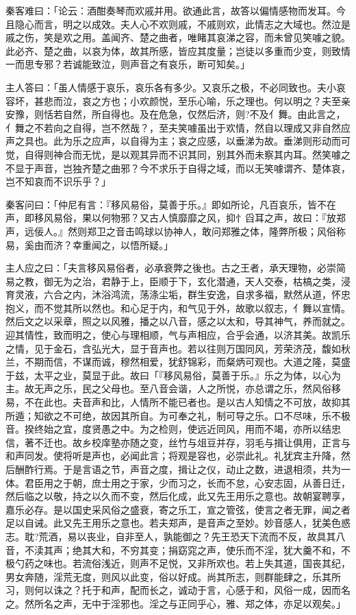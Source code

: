 \documentclass[UTF8,titlepage,oneside]{ctexbook}
\begin{document}
秦客难曰：「论云：酒酣奏琴而欢戚并用。欲通此言，故答以偏情感物而发耳。今且隐心而言，明之以成效。夫人心不欢则戚，不戚则欢，此情志之大域也。然泣是戚之伤，笑是欢之用。盖闻齐、楚之曲者，唯睹其哀涕之容，而未曾见笑噱之貌。此必齐、楚之曲，以哀为体，故其所感，皆应其度量；岂徒以多重而少变，则致情一而思专邪？若诚能致泣，则声音之有哀乐，断可知矣。」


主人答曰：「虽人情感于哀乐，哀乐各有多少。又哀乐之极，不必同致也。夫小哀容坏，甚悲而泣，哀之方也；小欢颜悦，至乐心喻，乐之理也。何以明之？夫至亲安豫，则恬若自然，所自得也。及在危急，仅然后济，则?不及亻舞。由此言之，亻舞之不若向之自得，岂不然哉？，至夫笑噱虽出于欢情，然自以理成又非自然应声之具也。此为乐之应声，以自得为主；哀之应感，以垂涕为故。垂涕则形动而可觉，自得则神合而无忧，是以观其异而不识其同，别其外而未察其内耳。然笑噱之不显于声音，岂独齐楚之曲邪？今不求乐于自得之域，而以无笑噱谓齐、楚体哀，岂不知哀而不识乐乎？」


秦客问曰：「仲尼有言：『移风易俗，莫善于乐。』即如所论，凡百哀乐，皆不在声，即移风易俗，果以何物邪？又古人慎靡靡之风，抑忄舀耳之声，故曰：『放郑声，远佞人。』然则郑卫之音击鸣球以协神人，敢问郑雅之体，隆弊所极；风俗称易，奚由而济？幸重闻之，以悟所疑。」


主人应之曰：「夫言移风易俗者，必承衰弊之後也。古之王者，承天理物，必崇简易之教，御无为之治，君静于上，臣顺于下，玄化潜通，天人交泰，枯槁之类，浸育灵液，六合之内，沐浴鸿流，荡涤尘垢，群生安逸，自求多福，默然从道，怀忠抱义，而不觉其所以然也。和心足于内，和气见于外，故歌以叙志，亻舞以宣情。然后文之以采章，照之以风雅，播之以八音，感之以太和，导其神气，养而就之。迎其情性，致而明之，使心与理相顺，气与声相应，合乎会通，以济其美。故凯乐之情，见于金石，含弘光大，显于音声也。若以往则万国同风，芳荣济茂，馥如秋兰，不期而信，不谋而诚，穆然相爱，犹舒锦彩，而粲炳可观也。大道之隆，莫盛于兹，太平之业，莫显于此。故曰「『移风易俗，莫善于乐。』乐之为体，以心为主。故无声之乐，民之父母也。至八音会谐，人之所悦，亦总谓之乐，然风俗移易，不在此也。夫音声和比，人情所不能已者也。是以古人知情之不可放，故抑其所遁；知欲之不可绝，故因其所自。为可奉之礼，制可导之乐。口不尽味，乐不极音。揆终始之宜，度贤愚之中。为之检则，使远近同风，用而不竭，亦所以结忠信，著不迁也。故乡校庠塾亦随之变，丝竹与俎豆并存，羽毛与揖让俱用，正言与和声同发。使将听是声也，必闻此言；将观是容也，必崇此礼。礼犹宾主升降，然后酬酢行焉。于是言语之节，声音之度，揖让之仪，动止之数，进退相须，共为一体。君臣用之于朝，庶士用之于家，少而习之，长而不怠，心安志固，从善日迁，然后临之以敬，持之以久而不变，然后化成，此又先王用乐之意也。故朝宴聘享，嘉乐必存。是以国史采风俗之盛衰，寄之乐工，宣之管弦，使言之者无罪，闻之者足以自诫。此又先王用乐之意也。若夫郑声，是音声之至妙。妙音感人，犹美色惑志。耽?荒酒，易以丧业，自非至人，孰能御之？先王恐天下流而不反，故具其八音，不渎其声；绝其大和，不穷其变；捐窈窕之声，使乐而不淫，犹大羹不和，不极勺药之味也。若流俗浅近，则声不足悦，又非所欢也。若上失其道，国丧其纪，男女奔随，淫荒无度，则风以此变，俗以好成。尚其所志，则群能肆之，乐其所习，则何以诛之？托于和声，配而长之，诚动于言，心感于和，风俗一成，因而名之。然所名之声，无中于淫邪也。淫之与正同乎心，雅、郑之体，亦足以观矣。」
\end{document}
